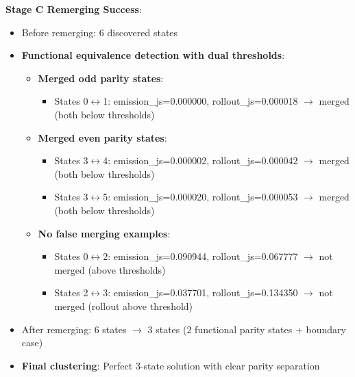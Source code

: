 \documentclass[11pt]{article}
\begin{document}
\begin{resultbox}
\textbf{Stage C Remerging Success}:
\begin{itemize}
\item Before remerging: 6 discovered states
\item \textbf{Functional equivalence detection with dual thresholds}:
  \begin{itemize}
  \item \textbf{Merged odd parity states}:
    \begin{itemize}
    \item States 0$\leftrightarrow$1: emission\_js=0.000000, rollout\_js=0.000018 $\rightarrow$ merged (both below thresholds)
    \end{itemize}
  \item \textbf{Merged even parity states}:
    \begin{itemize}
    \item States 3$\leftrightarrow$4: emission\_js=0.000002, rollout\_js=0.000042 $\rightarrow$ merged (both below thresholds)
    \item States 3$\leftrightarrow$5: emission\_js=0.000020, rollout\_js=0.000053 $\rightarrow$ merged (both below thresholds)
    \end{itemize}
  \item \textbf{No false merging examples}:
    \begin{itemize}
    \item States 0$\leftrightarrow$2: emission\_js=0.090944, rollout\_js=0.067777 $\rightarrow$ not merged (above thresholds)
    \item States 2$\leftrightarrow$3: emission\_js=0.037701, rollout\_js=0.134350 $\rightarrow$ not merged (rollout above threshold)
    \end{itemize}
  \end{itemize}
\item After remerging: 6 states $\rightarrow$ 3 states (2 functional parity states + boundary case)
\item \textbf{Final clustering}: Perfect 3-state solution with clear parity separation
\end{itemize}


\end{resultbox}
\end{document}
